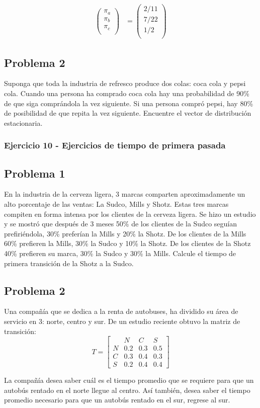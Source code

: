 \documentclass{article}
\begin{document}
\begin{align*}
    \begin{pmatrix}
        \pi_a \\
        \pi_b \\
        \pi_c \\
    \end{pmatrix}
     & =
    \begin{pmatrix}
        2/11 \\
        7/22 \\
        1/2 \\
    \end{pmatrix}
\end{align*}


\subsection*{Problema 2}

Suponga que toda la industria de refresco produce dos colas: coca cola y pepsi cola. Cuando una persona ha comprado coca cola hay una probabilidad de 90\% de que siga comprándola la vez siguiente. Si una persona compró pepsi, hay 80\% de posibilidad de que repita la vez siguiente. Encuentre el vector de distribución estacionaria.


\subsubsection{Ejercicio 10 - Ejercicios de tiempo de primera pasada}

\subsection*{Problema 1}
En la industria de la cerveza ligera, 3 marcas comparten aproximadamente un alto porcentaje de las ventas: La Sudco, Mills y Shotz. Estas tres marcas compiten en forma intensa por los clientes de la cerveza ligera. Se hizo un estudio y se mostró que después de 3 meses 50\% de los clientes de la Sudco seguían prefiriéndola, 30\% preferían la Mills y 20\% la Shotz. De los clientes de la Mills 60\% prefieren la Mills, 30\% la Sudco y 10\% la Shotz. De los clientes de la Shotz 40\% prefieren su marca, 30\% la Sudco y 30\% la Mills. Calcule el tiempo de primera transición de la Shotz a la Sudco.

\subsection*{Problema 2}
Una compañía que se dedica a la renta de autobuses, ha dividido su área de servicio en 3: norte, centro y sur. De un estudio reciente obtuvo la matriz de transición:
\[
    T=
    \begin{bmatrix}
          & N   & C   & S   \\
        N & 0.2 & 0.3 & 0.5 \\
        C & 0.3 & 0.4 & 0.3 \\
        S & 0.2 & 0.4 & 0.4
    \end{bmatrix}
\]

La compañía desea saber cuál es el tiempo promedio que se requiere para que un autobús rentado en el norte llegue al centro. Así también, desea saber el tiempo promedio necesario para que un autobús rentado en el sur, regrese al sur.
\end{document}
